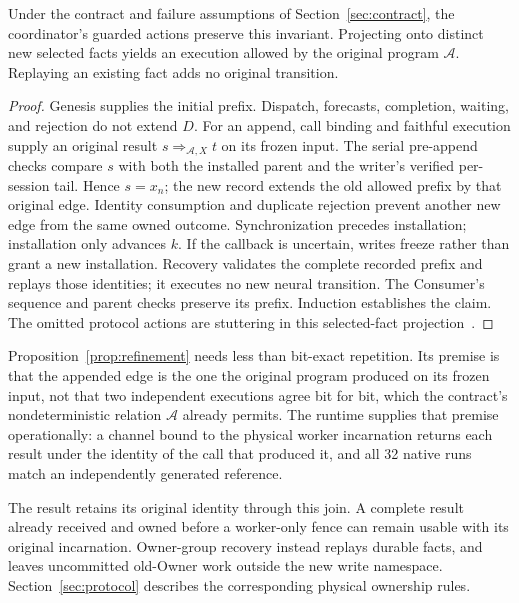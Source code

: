 \begin{proposition}
\label{prop:refinement}
Under the contract and failure assumptions of
Section~\ref{sec:contract}, the coordinator's guarded actions preserve
this invariant. Projecting onto distinct new selected facts yields an
execution allowed by the original program $\mathcal A$. Replaying an
existing fact adds no original transition.
\end{proposition}
\begin{proof}
Genesis supplies the initial prefix. Dispatch, forecasts, completion,
waiting, and rejection do not extend $D$. For an append, call binding
and faithful execution supply an original result
$s\mathrel{\Rightarrow_{\mathcal A,X}}t$ on its frozen input. The serial
pre-append checks compare $s$ with both the installed parent and the
writer's verified per-session tail. Hence $s=x_n$; the new record extends
the old allowed prefix by that original edge. Identity consumption and
duplicate rejection prevent another new edge from the same owned outcome.
Synchronization precedes installation; installation only advances $k$.
If the callback is uncertain, writes freeze rather than grant a new
installation. Recovery validates the complete recorded prefix and
replays those identities; it executes no new neural transition.
The Consumer's sequence and parent checks preserve its prefix.
Induction establishes the claim. The omitted protocol actions are
stuttering in this selected-fact projection~\cite{schneider1990statemachine,abadi1991refinement}.
\end{proof}

Proposition~\ref{prop:refinement} needs less than bit-exact repetition.
Its premise is that the appended edge is the one the original program
produced on its frozen input, not that two independent executions agree
bit for bit, which the contract's nondeterministic relation $\mathcal A$
already permits. The runtime supplies that premise operationally: a
channel bound to the physical worker incarnation returns each result
under the identity of the call that produced it, and all 32 native runs
match an independently generated reference.

The result retains its original identity through this join. A complete
result already received and owned before a worker-only fence can remain
usable with its original incarnation. Owner-group recovery instead
replays durable facts, and leaves uncommitted old-Owner work outside the
new write namespace. Section~\ref{sec:protocol} describes the corresponding
physical ownership rules.

